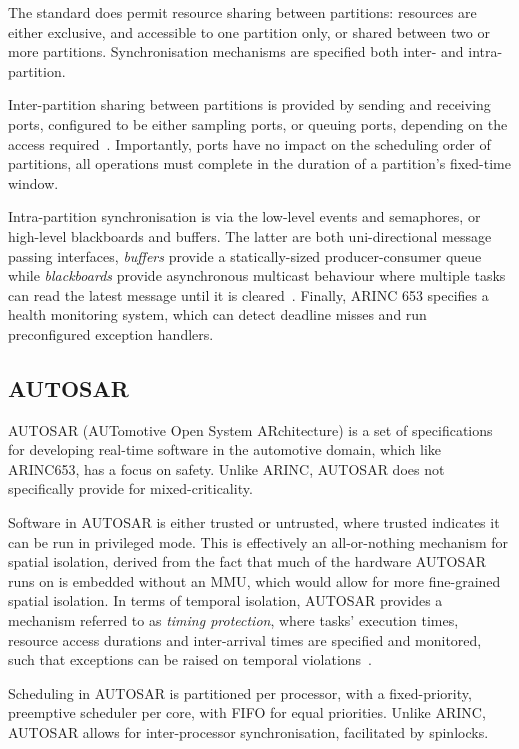 The standard does permit resource sharing between partitions: resources are either
exclusive, and accessible to one partition only, or shared between two or more partitions.
Synchronisation mechanisms are specified both inter- and intra-partition. 

Inter-partition sharing between partitions is provided by sending and receiving ports, configured to be either
sampling ports, or queuing ports, depending on the access required~\citep{Kinnan_Wlad_04}.
Importantly, ports have no 
impact on the scheduling order of partitions, all operations must complete in the duration of a
partition's fixed-time window.

Intra-partition synchronisation is via the low-level events and semaphores, or high-level
blackboards and buffers. The latter are both uni-directional 
message passing interfaces, \emph{buffers} provide a statically-sized producer-consumer queue while
\emph{blackboards} provide asynchronous multicast behaviour where multiple tasks can read the latest
message until it is cleared~\citep{Zuepke_BL_15}.
Finally, ARINC 653 specifies a health monitoring system, which can detect deadline misses and run
preconfigured exception handlers.

\subsection{AUTOSAR}
\label{sec:os-autosar}

AUTOSAR (AUTomotive Open System ARchitecture) is a set of specifications for developing real-time
software in the automotive domain, which like ARINC653, has a focus on safety. Unlike ARINC, AUTOSAR
does not specifically provide for mixed-criticality.

Software in AUTOSAR is either trusted or untrusted, where trusted indicates it can be run in
privileged mode. This is effectively an all-or-nothing mechanism for spatial isolation, derived
from the fact that much of the hardware AUTOSAR runs on is embedded without an \gls{MMU}, which
would allow for more fine-grained spatial isolation.
In terms of temporal isolation, AUTOSAR provides a mechanism referred to as \emph{timing
protection}, where tasks' execution times, resource access durations and inter-arrival times are
specified and monitored, such that exceptions can be raised on temporal
violations~\citep{Zuepke_BL_15}. 

Scheduling in AUTOSAR is partitioned per processor, with a  
fixed-priority, preemptive scheduler per core, with \gls{FIFO} for equal priorities. Unlike ARINC,
AUTOSAR allows for inter-processor synchronisation, facilitated by spinlocks. 

